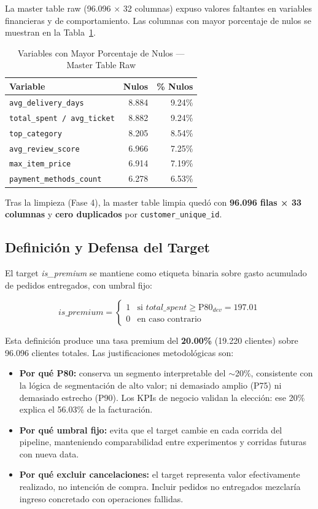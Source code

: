 \documentclass[journal,letterpaper]{IEEEtran}
\begin{document}
La master table raw (96.096 × 32 columnas) expuso valores faltantes en variables financieras y de comportamiento. Las columnas con mayor porcentaje de nulos se muestran en la Tabla~\ref{tab:nulls_raw}.

\begin{table}[h]
\centering
\caption{Variables con Mayor Porcentaje de Nulos — Master Table Raw}
\label{tab:nulls_raw}
\begin{tabular}{lrr}
\toprule
Variable & Nulos & \% Nulos \\
\midrule
\texttt{avg\_delivery\_days}       & 8.884 & 9.24\% \\
\texttt{total\_spent / avg\_ticket} & 8.882 & 9.24\% \\
\texttt{top\_category}             & 8.205 & 8.54\% \\
\texttt{avg\_review\_score}        & 6.966 & 7.25\% \\
\texttt{max\_item\_price}          & 6.914 & 7.19\% \\
\texttt{payment\_methods\_count}   & 6.278 & 6.53\% \\
\bottomrule
\end{tabular}
\end{table}

Tras la limpieza (Fase 4), la master table limpia quedó con \textbf{96.096 filas × 33 columnas} y \textbf{cero duplicados} por \texttt{customer\_unique\_id}.

\subsection{Definición y Defensa del Target}
El target \textit{is\_premium} se mantiene como etiqueta binaria sobre gasto acumulado de pedidos entregados, con umbral fijo:

\begin{equation}
is\_premium = \begin{cases}
1 & \text{si } total\_spent \geq \text{P80}_{dev} = 197.01 \\
0 & \text{en caso contrario}
\end{cases}
\end{equation}

Esta definición produce una tasa premium del \textbf{20.00\%} (19.220 clientes) sobre 96.096 clientes totales. Las justificaciones metodológicas son:
\begin{itemize}
    \item \textbf{Por qué P80:} conserva un segmento interpretable del $\sim$20\%, consistente con la lógica de segmentación de alto valor; ni demasiado amplio (P75) ni demasiado estrecho (P90). Los KPIs de negocio validan la elección: ese 20\% explica el 56.03\% de la facturación.
    \item \textbf{Por qué umbral fijo:} evita que el target cambie en cada corrida del pipeline, manteniendo comparabilidad entre experimentos y corridas futuras con nueva data.
    \item \textbf{Por qué excluir cancelaciones:} el target representa valor efectivamente realizado, no intención de compra. Incluir pedidos no entregados mezclaría ingreso concretado con operaciones fallidas.
\end{itemize}
\end{document}

